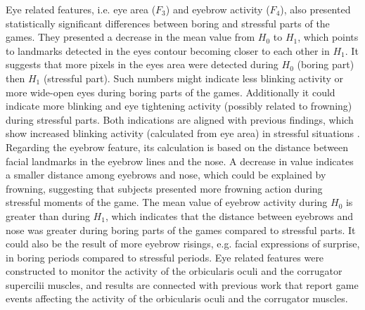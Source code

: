 Eye related features, i.e. eye area ($F_3$) and eyebrow activity ($F_4$), also presented statistically significant differences between boring and stressful parts of the games. They presented a decrease in the mean value from $H_0$ to $H_1$, which points to landmarks detected in the eyes contour becoming closer to each other in $H_1$. It suggests that more pixels in the eyes area were detected during $H_0$ (boring part) then $H_1$ (stressful part). Such numbers might indicate less blinking activity or more wide-open eyes during boring parts of the games. Additionally it could indicate more blinking and eye tightening activity (possibly related to frowning) during stressful parts. Both indications are aligned with previous findings, which show increased blinking activity (calculated from eye area) in stressful situations \parencite{giannakakis2017stress}. Regarding the eyebrow feature, its calculation is based on the distance between facial landmarks in the eyebrow lines and the nose. A decrease in value indicates a smaller distance among eyebrows and nose, which could be explained by frowning, suggesting that subjects presented more frowning action during stressful moments of the game. The mean value of eyebrow activity during $H_0$ is greater than during $H_1$, which indicates that the distance between eyebrows and nose was greater during boring parts of the games compared to stressful parts. It could also be the result of more eyebrow risings, e.g. facial expressions of surprise, in boring periods compared to stressful periods. Eye related features were constructed to monitor the activity of the orbicularis oculi and the corrugator supercilii muscles, and results are connected with previous work that report game events affecting the activity of the orbicularis oculi \parencite{ravaja20051} and the corrugator \parencite{hazlett2006measuring} muscles.


